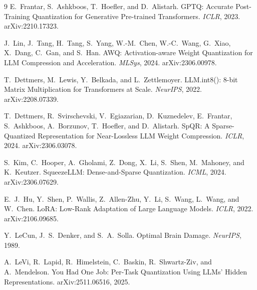 \documentclass[11pt]{article}
\begin{document}
\begin{thebibliography}{9}
 E.~Frantar, S.~Ashkboos, T.~Hoefler, and D.~Alistarh.
  \newblock GPTQ: Accurate Post-Training Quantization for Generative
  Pre-trained Transformers.
  \newblock \emph{ICLR}, 2023. arXiv:2210.17323.

 J.~Lin, J.~Tang, H.~Tang, S.~Yang, W.-M.~Chen,
  W.-C.~Wang, G.~Xiao, X.~Dang, C.~Gan, and S.~Han.
  \newblock AWQ: Activation-aware Weight Quantization for LLM Compression and
  Acceleration.
  \newblock \emph{MLSys}, 2024. arXiv:2306.00978.

 T.~Dettmers, M.~Lewis, Y.~Belkada, and
  L.~Zettlemoyer.
  \newblock LLM.int8(): 8-bit Matrix Multiplication for Transformers at Scale.
  \newblock \emph{NeurIPS}, 2022. arXiv:2208.07339.

 T.~Dettmers, R.~Svirschevski, V.~Egiazarian,
  D.~Kuznedelev, E.~Frantar, S.~Ashkboos, A.~Borzunov, T.~Hoefler, and
  D.~Alistarh.
  \newblock SpQR: A Sparse-Quantized Representation for Near-Lossless LLM Weight
  Compression.
  \newblock \emph{ICLR}, 2024. arXiv:2306.03078.

 S.~Kim, C.~Hooper, A.~Gholami, Z.~Dong, X.~Li,
  S.~Shen, M.~Mahoney, and K.~Keutzer.
  \newblock SqueezeLLM: Dense-and-Sparse Quantization.
  \newblock \emph{ICML}, 2024. arXiv:2306.07629.

 E.~J.~Hu, Y.~Shen, P.~Wallis, Z.~Allen-Zhu, Y.~Li,
  S.~Wang, L.~Wang, and W.~Chen.
  \newblock LoRA: Low-Rank Adaptation of Large Language Models.
  \newblock \emph{ICLR}, 2022. arXiv:2106.09685.

 Y.~LeCun, J.~S.~Denker, and S.~A.~Solla.
  \newblock Optimal Brain Damage.
  \newblock \emph{NeurIPS}, 1989.

 A.~LeVi, R.~Lapid, R.~Himelstein, C.~Baskin,
  R.~Shwartz-Ziv, and A.~Mendelson.
  \newblock You Had One Job: Per-Task Quantization Using LLMs' Hidden
  Representations.
  \newblock arXiv:2511.06516, 2025.
\end{thebibliography}
\end{document}
